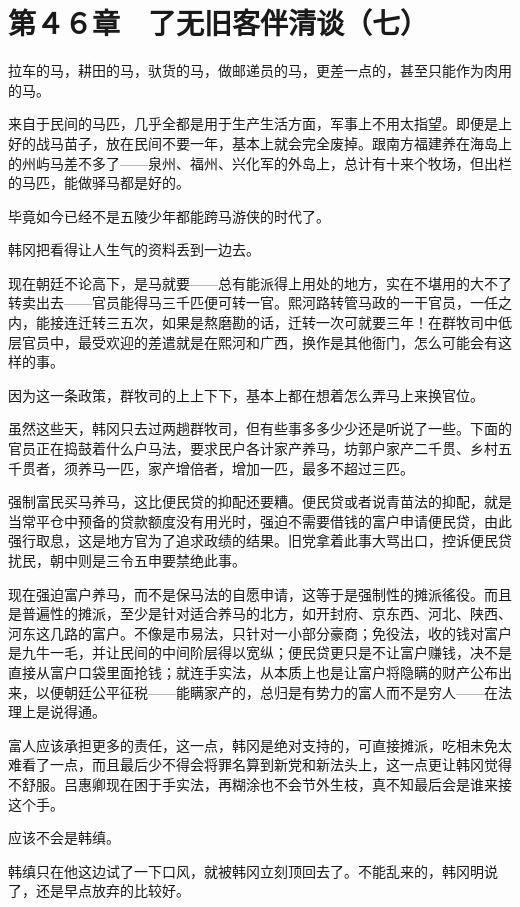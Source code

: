 \section{第４６章　了无旧客伴清谈（七）}

拉车的马，耕田的马，驮货的马，做邮递员的马，更差一点的，甚至只能作为肉用的马。

来自于民间的马匹，几乎全都是用于生产生活方面，军事上不用太指望。即便是上好的战马苗子，放在民间不要一年，基本上就会完全废掉。跟南方福建养在海岛上的州屿马差不多了——泉州、福州、兴化军的外岛上，总计有十来个牧场，但出栏的马匹，能做驿马都是好的。

毕竟如今已经不是五陵少年都能跨马游侠的时代了。

韩冈把看得让人生气的资料丢到一边去。

现在朝廷不论高下，是马就要——总有能派得上用处的地方，实在不堪用的大不了转卖出去——官员能得马三千匹便可转一官。熙河路转管马政的一干官员，一任之内，能接连迁转三五次，如果是熬磨勘的话，迁转一次可就要三年！在群牧司中低层官员中，最受欢迎的差遣就是在熙河和广西，换作是其他衙门，怎么可能会有这样的事。

因为这一条政策，群牧司的上上下下，基本上都在想着怎么弄马上来换官位。

虽然这些天，韩冈只去过两趟群牧司，但有些事多多少少还是听说了一些。下面的官员正在捣鼓着什么户马法，要求民户各计家产养马，坊郭户家产二千贯、乡村五千贯者，须养马一匹，家产增倍者，增加一匹，最多不超过三匹。

强制富民买马养马，这比便民贷的抑配还要糟。便民贷或者说青苗法的抑配，就是当常平仓中预备的贷款额度没有用光时，强迫不需要借钱的富户申请便民贷，由此强行取息，这是地方官为了追求政绩的结果。旧党拿着此事大骂出口，控诉便民贷扰民，朝中则是三令五申要禁绝此事。

现在强迫富户养马，而不是保马法的自愿申请，这等于是强制性的摊派徭役。而且是普遍性的摊派，至少是针对适合养马的北方，如开封府、京东西、河北、陕西、河东这几路的富户。不像是市易法，只针对一小部分豪商；免役法，收的钱对富户是九牛一毛，并让民间的中间阶层得以宽纵；便民贷更只是不让富户赚钱，决不是直接从富户口袋里面抢钱；就连手实法，从本质上也是让富户将隐瞒的财产公布出来，以便朝廷公平征税——能瞒家产的，总归是有势力的富人而不是穷人——在法理上是说得通。

富人应该承担更多的责任，这一点，韩冈是绝对支持的，可直接摊派，吃相未免太难看了一点，而且最后少不得会将罪名算到新党和新法头上，这一点更让韩冈觉得不舒服。吕惠卿现在困于手实法，再糊涂也不会节外生枝，真不知最后会是谁来接这个手。

应该不会是韩缜。

韩缜只在他这边试了一下口风，就被韩冈立刻顶回去了。不能乱来的，韩冈明说了，还是早点放弃的比较好。


